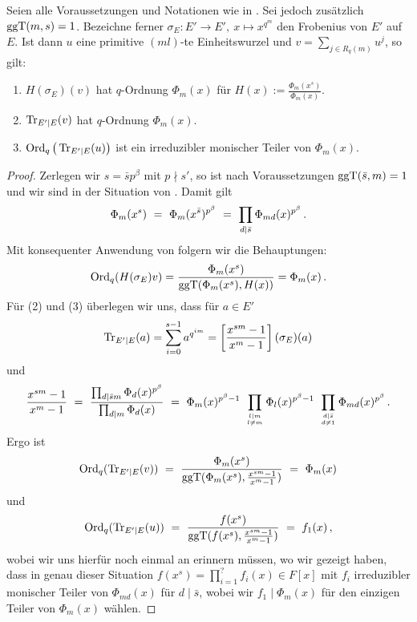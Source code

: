 \begin{satz}
  \label{satz:q_ordnung_von_trace}
  Seien alle Voraussetzungen und Notationen wie in 
  .
  Sei jedoch zusätzlich $\operatorname{ggT}(m,s) = 1$.
  Bezeichne ferner 
  $\sigma_E: E'\to E',\ x \mapsto x^{q^m}$ den Frobenius von $E'$ auf $E$.
  Ist dann $u$ eine primitive $(ml)$-te Einheitswurzel
  und $v = \sum_{j\in R_q(m)} u^j$, so gilt:
  \begin{enumerate}
    \item $H(\sigma_E)(v)$ hat $q$-Ordnung $\Phi_m(x)$ für 
      $H(x) := \frac{\Phi_m(x^s)}{\Phi_m(x)}$.
    \item $\operatorname{Tr}_{E'\mid E}(v)$ hat $q$-Ordnung $\Phi_m(x)$.
    \item $\operatorname{Ord}_q\big(\operatorname{Tr}_{E'\mid E}(u)\big)$ ist ein irreduzibler 
      monischer Teiler von $\Phi_m(x)$.
  \end{enumerate}
\end{satz}
\begin{proof}
  Zerlegen wir $s = \bar s p^\beta$ mit $p\nmid s'$, so ist 
  nach Voraussetzungen $\operatorname{ggT}(\bar s, m) = 1$ und wir sind in der Situation von
  . Damit gilt
  \[ \Phi_m(x^s) \ =\  \Phi_m(x^{\bar s})^{p^\beta}
    \ =\  \prod_{d \mid \bar s} \Phi_{md}(x)^{p^\beta}\,.\]
  Mit konsequenter Anwendung von 
  folgern wir die Behauptungen:
  \[ \operatorname{Ord}_q(H(\sigma_E)v) = \frac{\Phi_m(x^s)}{\operatorname{ggT}(\Phi_m(x^s), H(x))}
    = \Phi_m(x)\,.\]
  Für (2) und (3) überlegen wir uns, dass für $a \in E'$
  \[ \operatorname{Tr}_{E'\mid E}(a) = \sum_{i=0}^{s-1} a^{q^{im}} = 
    \left[\frac{x^{sm}-1}{x^m-1}\right](\sigma_E)(a)\]
  und 
  \[ \frac{x^{sm} -1}{x^m-1} \speq= 
    \frac{ \prod_{d\mid \bar sm} \Phi_d(x)^{p^\beta}}{
      \prod_{d\mid m} \Phi_d(x)} \speq=
    \Phi_m(x)^{p^\beta-1}\ 
    \prod_{l\mid m\atop l\neq m} \Phi_l(x)^{p^\beta-1}\ 
    \prod_{d\mid \bar s\atop d\neq 1} \Phi_{md}(x)^{p^\beta} \,.\]
  Ergo ist
  \[ \operatorname{Ord}_q(\operatorname{Tr}_{E'\mid E}(v)) \ =\  
    \frac{\Phi_m(x^s)}{\operatorname{ggT}(\Phi_m(x^s), \frac{x^{sm}-1}{x^m-1})}
    \ =\  \Phi_m(x)\]
  und
  \[ \operatorname{Ord}_q(\operatorname{Tr}_{E'\mid E}(u)) \ =\  
    \frac{f(x^s)}{\operatorname{ggT}(f(x^s), \frac{x^{sm}-1}{x^m-1})} \ =\  f_1(x) \,,\]
  wobei wir uns hierfür noch einmal an  
  erinnern müssen, wo wir gezeigt haben, dass in genau dieser Situation 
  $f(x^s) = \prod_{i=1}^? f_i(x) \in F[x]$ mit $f_i$ irreduzibler monischer 
  Teiler von $\Phi_{md}(x)$ für $d\mid \bar s$, wobei wir \obda 
  $f_1 \mid \Phi_m(x)$ für den einzigen Teiler von $\Phi_m(x)$ wählen.
\end{proof}


